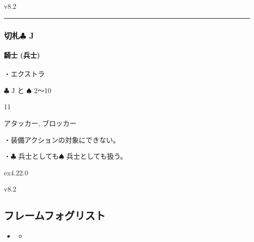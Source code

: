 \documentclass[letterpaper,10pt,dvipdfmx]{sphinxmanual}
\begin{document}
\sphinxAtStartPar
{}  v8.2


\bigskip\hrule\bigskip



\subsubsection{切札{\normalsize $\clubsuit$} J}
\label{\detokenize{auto/frameActionlist:id97}}

\paragraph{騎士 (兵士)}
\label{\detokenize{auto/frameActionlist:char-knight}}\label{\detokenize{auto/frameActionlist:id98}}
\sphinxAtStartPar
{}

\sphinxAtStartPar
・エクストラ

\sphinxAtStartPar
{} {\normalsize $\clubsuit$} J と {\normalsize $\spadesuit$} 2〜10

\sphinxAtStartPar
{} 11

\sphinxAtStartPar
{} アタッカー, ブロッカー

\sphinxAtStartPar
{}

\sphinxAtStartPar
・装備アクションの対象にできない。

\sphinxAtStartPar
・{\normalsize $\clubsuit$} 兵士としても{\normalsize $\spadesuit$} 兵士としても扱う。

\sphinxAtStartPar
{}  ex4.22.0

\sphinxAtStartPar
{}  v8.2


\subsection{フレームフォグリスト}
\label{\detokenize{auto/frameActionlist:foglist-act-frame}}\label{\detokenize{auto/frameActionlist:id99}}
\begin{sphinxShadowBox}
\begin{itemize}
\item {} 
\sphinxAtStartPar
{}\label{\detokenize{auto/frameActionlist:id268}}{\hyperref[\detokenize{auto/frameActionlist:id101}]{}}
\begin{itemize}
\item {} 
\sphinxAtStartPar
{}\label{\detokenize{auto/frameActionlist:id269}}{\hyperref[\detokenize{auto/frameActionlist:fog-closefog}]{}}

\end{itemize}

\end{itemize}
\end{sphinxShadowBox}
\end{document}
